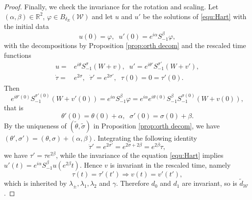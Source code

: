 \documentclass[10pt,a4paper]{amsart}
\newcommand{\R}{\mathbb{R}}
\begin{document}
\begin{proof}
		Finally, we check the invariance for the rotation and scaling. Let $(\alpha,\beta)\in\R^2$, $\varphi\in B_{\delta_E}(\mathcal{W})$ and let $u$ and $u'$ be the solutions of \eqref{equ:Hart} with the initial data
		\begin{equation*}
		u(0)=\varphi,\;\; u'(0)=e^{i\alpha} S_{-1}^{\beta}\varphi,
		\end{equation*}
		with the decompositions by Proposition \ref{prop:orth decom} and the rescaled time functions
		\begin{align*}
		u=&e^{i\theta} S_{-1}^{\sigma}(W+v),\;\;u'=e^{i\theta'} S_{-1}^{\sigma'}(W+v'),\\ \dot\tau=&e^{2\sigma},\;\;\dot\tau'=e^{2\sigma'},\;\;\tau(0)=0=\tau'(0).
		\end{align*}
		Then 
		\begin{equation*}
		e^{i\theta'(0)} S_{-1}^{\sigma'(0)}(W+v'(0))=e^{i\alpha} S_{-1}^{\beta}\varphi=e^{i\alpha}e^{i\theta(0)}S_{-1}^{\beta} S_{-1}^{\sigma(0)}(W+v(0)),
		\end{equation*}
		that is 
		\begin{equation*}
		\theta'(0)=\theta(0)+\alpha,\;\;\sigma'(0)=\sigma(0)+\beta.
		\end{equation*}
		By the uniqueness of $\left(\widetilde{\theta},\widetilde{\sigma} \right)$ in Proposition \ref{prop:orth decom}, we have $\left(\theta',\sigma' \right)=\left(\theta,\sigma\right)+(\alpha,\beta)$.
		Integrating the following identity
		\begin{equation*}
		\dot\tau'=e^{2\sigma'}=e^{2\sigma+2\beta}=e^{2\beta}\dot\tau,
		\end{equation*}
		we have $\tau'=\tau e^{2\beta}$, while the invariance of the equation \eqref{equ:Hart} implies $u'(t)=e^{i\alpha} S_{-1}^{\beta}u(e^{2\beta}t)$. Hence $v$ is invariant in the rescaled time, namely
		\begin{equation*}
		\tau(t)=\tau'(t') \Longrightarrow v(t)=v'(t'),
		\end{equation*}
		which is inherited by $\lambda_{\pm},\lambda_1,\lambda_2$ and $\gamma$. Therefore $d_0$ and $d_1$ are invariant, so is $\widetilde{d}_{\mathcal{W}}$.
	\end{proof}
\end{document}
